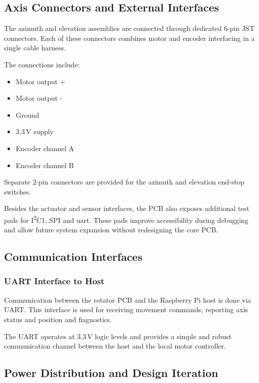 \subsection{Axis Connectors and External Interfaces}
\label{subsec:rotator_connectors}

The azimuth and elevation assemblies are connected through dedicated 6-pin JST connectors. Each of these connectors combines motor and encoder interfacing in a single cable harness. 

The connections include:

\begin{itemize}
\item Motor output +
\item Motor output -
\item Ground
\item 3.3\,V supply
\item Encoder channel A
\item Encoder channel B
\end{itemize}

Separate 2-pin connectors are provided for the azimuth and elevation end-stop switches.

Besides the actuator and sensor interfaces, the PCB also exposes additional test pads for I\textsuperscript{2}C1, SPI and uart. These pads improve accessibility during debugging and allow future system expansion without redesigning the core PCB.

\subsection{Communication Interfaces}
\label{subsec:rotator_interfaces}

\subsubsection{UART Interface to Host}
\label{subsubsec:rotator_uart}

Communication between the rotator PCB and the Raspberry Pi host is done via UART. This interface is used for receiving movement commands, reporting axis status and position and fiagnostics.

The UART operates at 3.3\,V logic levels and provides a simple and robust communication channel between the host and the local motor controller.

\subsection{Power Distribution and Design Iteration}
\label{subsec:rotator_power}

